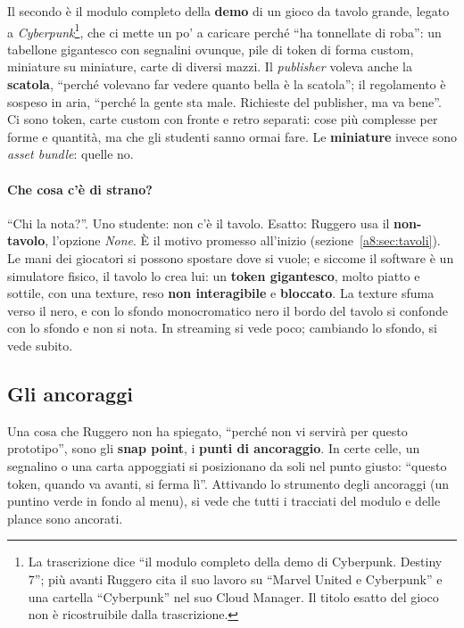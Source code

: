Il secondo è il modulo completo della \textbf{demo} di un gioco da tavolo grande,
legato a \emph{Cyberpunk}\footnote{La trascrizione dice ``il modulo completo della demo
di Cyberpunk. Destiny 7''; più avanti Ruggero cita il suo lavoro su ``Marvel United e
Cyberpunk'' e una cartella ``Cyberpunk'' nel suo Cloud Manager. Il titolo esatto del
gioco non è ricostruibile dalla trascrizione.}, che ci mette un po' a caricare perché
``ha tonnellate di roba'': un tabellone gigantesco con segnalini ovunque, pile di token
di forma custom, miniature su miniature, carte di diversi mazzi. Il \emph{publisher}
voleva anche la \textbf{scatola}, ``perché volevano far vedere quanto bella è la
scatola''; il regolamento è sospeso in aria, ``perché la gente sta male. Richieste del
publisher, ma va bene''. Ci sono token, carte custom con fronte e retro separati: cose
più complesse per forme e quantità, ma che gli studenti sanno ormai fare. Le
\textbf{miniature} invece sono \emph{asset bundle}: quelle no.

\paragraph{Che cosa c'è di strano?} ``Chi la nota?''. Uno studente: non c'è il tavolo.
Esatto: Ruggero usa il \textbf{non-tavolo}, l'opzione \emph{None}. È il motivo
promesso all'inizio (sezione~\ref{a8:sec:tavoli}). Le mani dei giocatori si possono
spostare dove si vuole; e siccome il software è un simulatore fisico, il tavolo lo crea
lui: un \textbf{token gigantesco}, molto piatto e sottile, con una texture, reso
\textbf{non interagibile} e \textbf{bloccato}. La texture sfuma verso il nero, e con lo
sfondo monocromatico nero il bordo del tavolo si confonde con lo sfondo e non si nota.
In streaming si vede poco; cambiando lo sfondo, si vede subito.

\subsection{Gli ancoraggi}
\label{a8:sec:ancoraggi}

Una cosa che Ruggero non ha spiegato, ``perché non vi servirà per questo prototipo'',
sono gli \textbf{snap point}, i \textbf{punti di ancoraggio}. In certe celle, un
segnalino o una carta appoggiati si posizionano da soli nel punto giusto: ``questo
token, quando va avanti, si ferma lì''. Attivando lo strumento degli ancoraggi (un
puntino verde in fondo al menu), si vede che tutti i tracciati del modulo e delle plance
sono ancorati.

